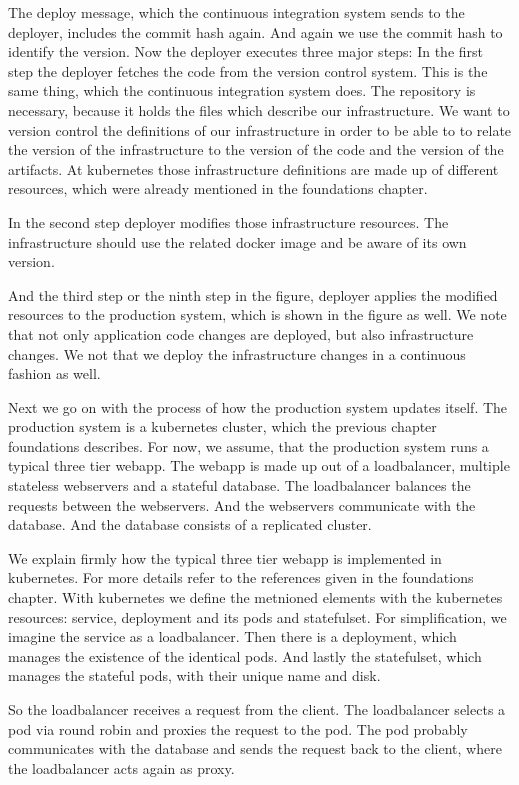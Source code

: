 The deploy message, which the continuous integration system sends to the deployer,
includes the commit hash again. And again we use the commit hash to identify the
version. Now the deployer executes three major steps: In the first step the deployer
fetches the code from the version control system. This is the same thing, which the
continuous integration system does. The repository is necessary, because it holds the
files which describe our infrastructure. We want to version control the definitions of our
infrastructure in order to be able to to relate the version of the infrastructure to the
version of the code and the version of the artifacts. At kubernetes those infrastructure
definitions are made up of different resources, which were already mentioned in the
foundations chapter.

In the second step deployer modifies those infrastructure resources. The infrastructure
should use the related docker image and be aware of its own version.

And the third step or the ninth step in the figure, deployer applies the modified
resources to the production system, which is shown in the figure as well. We note that not
only application code changes are deployed, but also infrastructure changes. We not that
we deploy the infrastructure changes in a continuous fashion as well.

Next we go on with the process of how the production system updates itself. The production
system is a kubernetes cluster, which the previous chapter foundations describes. For now,
we assume, that the production system runs a typical three tier webapp. The webapp is made
up out of a loadbalancer, multiple stateless webservers and a stateful database. The
loadbalancer balances the requests between the webservers. And the webservers communicate
with the database. And the database consists of a replicated cluster.

We explain firmly how the typical three tier webapp is implemented in kubernetes. For more
details refer to the references given in the foundations chapter. With kubernetes we
define the metnioned elements with the kubernetes resources: service, deployment and its
pods and statefulset. For simplification, we imagine the service as a loadbalancer. Then
there is a deployment, which manages the existence of the identical pods. And lastly the
statefulset, which manages the stateful pods, with their unique name and disk.

So the loadbalancer receives a request from the client. The loadbalancer selects a pod via
round robin and proxies the request to the pod. The pod probably communicates with the
database and sends the request back to the client, where the loadbalancer acts again as
proxy.

